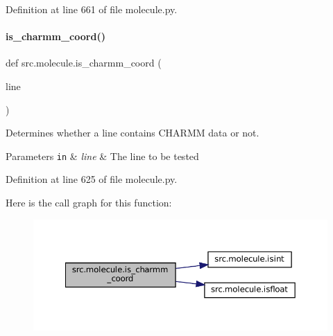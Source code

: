 Definition at line 661 of file molecule.\+py.

\mbox{\label{namespacesrc_1_1molecule_a17d81a43f4f28d4db24d6548dc7018dd}} 
\paragraph{\texorpdfstring{is\+\_\+charmm\+\_\+coord()}{is\_charmm\_coord()}}
{\footnotesize\ttfamily def src.\+molecule.\+is\+\_\+charmm\+\_\+coord (\begin{DoxyParamCaption}\item[{}]{line }\end{DoxyParamCaption})}



Determines whether a line contains C\+H\+A\+R\+MM data or not. 


\begin{DoxyParams}[1]{Parameters}
\mbox{\tt in}  & {\em line} & The line to be tested \\
\hline
\end{DoxyParams}


Definition at line 625 of file molecule.\+py.

Here is the call graph for this function\+:
\nopagebreak
\begin{figure}[H]
\begin{center}
\leavevmode
\includegraphics[width=350pt]{namespacesrc_1_1molecule_a17d81a43f4f28d4db24d6548dc7018dd_cgraph}
\end{center}
\end{figure}
\mbox{\label{namespacesrc_1_1molecule_a0f007f8498ecc025f1e066d47fabfd24}} 
